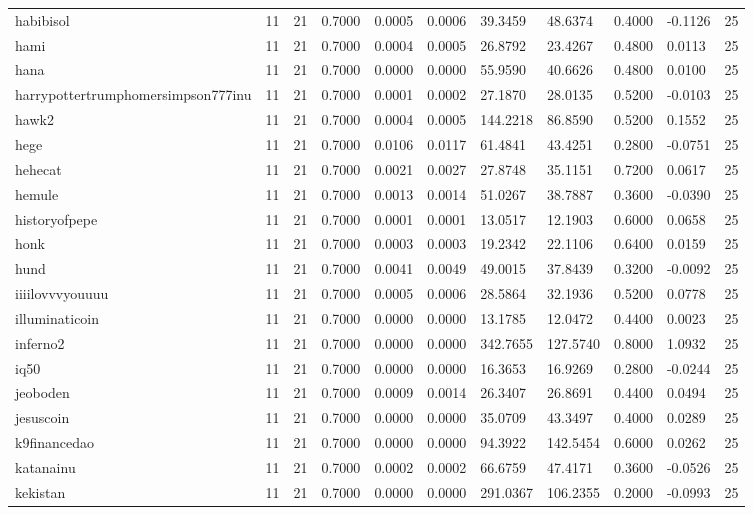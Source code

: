 \begin{table}[htbp]
\begin{tabular}{lllllllllll}
habibisol & 11 & 21 & 0.7000 & 0.0005 & 0.0006 & 39.3459 & 48.6374 & 0.4000 & -0.1126 & 25 \\
hami & 11 & 21 & 0.7000 & 0.0004 & 0.0005 & 26.8792 & 23.4267 & 0.4800 & 0.0113 & 25 \\
hana & 11 & 21 & 0.7000 & 0.0000 & 0.0000 & 55.9590 & 40.6626 & 0.4800 & 0.0100 & 25 \\
harrypottertrumphomersimpson777inu & 11 & 21 & 0.7000 & 0.0001 & 0.0002 & 27.1870 & 28.0135 & 0.5200 & -0.0103 & 25 \\
hawk2 & 11 & 21 & 0.7000 & 0.0004 & 0.0005 & 144.2218 & 86.8590 & 0.5200 & 0.1552 & 25 \\
hege & 11 & 21 & 0.7000 & 0.0106 & 0.0117 & 61.4841 & 43.4251 & 0.2800 & -0.0751 & 25 \\
hehecat & 11 & 21 & 0.7000 & 0.0021 & 0.0027 & 27.8748 & 35.1151 & 0.7200 & 0.0617 & 25 \\
hemule & 11 & 21 & 0.7000 & 0.0013 & 0.0014 & 51.0267 & 38.7887 & 0.3600 & -0.0390 & 25 \\
historyofpepe & 11 & 21 & 0.7000 & 0.0001 & 0.0001 & 13.0517 & 12.1903 & 0.6000 & 0.0658 & 25 \\
honk & 11 & 21 & 0.7000 & 0.0003 & 0.0003 & 19.2342 & 22.1106 & 0.6400 & 0.0159 & 25 \\
hund & 11 & 21 & 0.7000 & 0.0041 & 0.0049 & 49.0015 & 37.8439 & 0.3200 & -0.0092 & 25 \\
iiiilovvvyouuuu & 11 & 21 & 0.7000 & 0.0005 & 0.0006 & 28.5864 & 32.1936 & 0.5200 & 0.0778 & 25 \\
illuminaticoin & 11 & 21 & 0.7000 & 0.0000 & 0.0000 & 13.1785 & 12.0472 & 0.4400 & 0.0023 & 25 \\
inferno2 & 11 & 21 & 0.7000 & 0.0000 & 0.0000 & 342.7655 & 127.5740 & 0.8000 & 1.0932 & 25 \\
iq50 & 11 & 21 & 0.7000 & 0.0000 & 0.0000 & 16.3653 & 16.9269 & 0.2800 & -0.0244 & 25 \\
jeoboden & 11 & 21 & 0.7000 & 0.0009 & 0.0014 & 26.3407 & 26.8691 & 0.4400 & 0.0494 & 25 \\
jesuscoin & 11 & 21 & 0.7000 & 0.0000 & 0.0000 & 35.0709 & 43.3497 & 0.4000 & 0.0289 & 25 \\
k9financedao & 11 & 21 & 0.7000 & 0.0000 & 0.0000 & 94.3922 & 142.5454 & 0.6000 & 0.0262 & 25 \\
katanainu & 11 & 21 & 0.7000 & 0.0002 & 0.0002 & 66.6759 & 47.4171 & 0.3600 & -0.0526 & 25 \\
kekistan & 11 & 21 & 0.7000 & 0.0000 & 0.0000 & 291.0367 & 106.2355 & 0.2000 & -0.0993 & 25 \\

\end{tabular}
\end{table}
